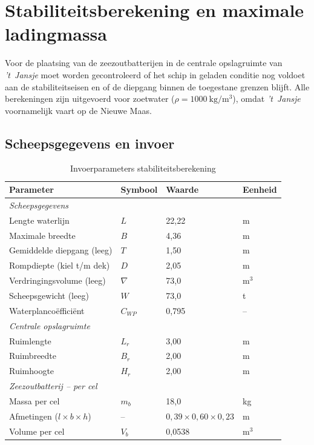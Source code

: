 \chapter{Stabiliteitsberekening en maximale ladingmassa}
\label{chap:stabiliteit}

Voor de plaatsing van de zeezoutbatterijen in de centrale opslagruimte van
\emph{'t~Jansje} moet worden gecontroleerd of het schip in geladen conditie
nog voldoet aan de stabiliteitseisen en of de diepgang binnen de toegestane
grenzen blijft. Alle berekeningen zijn uitgevoerd voor zoetwater
($\rho = 1000\ \mathrm{kg/m^3}$), omdat \emph{'t~Jansje} voornamelijk vaart
op de Nieuwe Maas.

\section{Scheepsgegevens en invoer}
\label{sec:stab_geometrie}

\begin{table}[H]
\centering
\caption{Invoerparameters stabiliteitsberekening}
\label{tab:stab_input}
\begin{tabular}{llll}
\toprule
Parameter & Symbool & Waarde & Eenheid \\
\midrule
\multicolumn{4}{l}{\textit{Scheepsgegevens}} \\
\midrule
Lengte waterlijn            & $L$      & 22{,}22 & m     \\
Maximale breedte            & $B$      &  4{,}36 & m     \\
Gemiddelde diepgang (leeg)  & $T$      &  1{,}50 & m     \\
Rompdiepte (kiel t/m dek)   & $D$      &  2{,}05 & m     \\
Verdringingsvolume (leeg)   & $\nabla$ & 73{,}0  & m$^3$ \\
Scheepsgewicht (leeg)       & $W$      & 73{,}0  & t     \\
Waterplancoëfficiënt        & $C_{WP}$ &  0{,}795& --    \\
\midrule
\multicolumn{4}{l}{\textit{Centrale opslagruimte}} \\
\midrule
Ruimlengte                  & $L_r$    &  3{,}00 & m     \\
Ruimbreedte                 & $B_r$    &  2{,}00 & m     \\
Ruimhoogte                  & $H_r$    &  2{,}00 & m     \\
\midrule
\multicolumn{4}{l}{\textit{Zeezoutbatterij -- per cel \cite{DrTenInfo2025}}} \\
\midrule
Massa per cel               & $m_b$    & 18{,}0  & kg    \\
Afmetingen ($l \times b \times h$) & -- & $0{,}39 \times 0{,}60 \times 0{,}23$ & m \\
Volume per cel              & $V_b$    & 0{,}0538& m$^3$ \\
\bottomrule
\end{tabular}
\end{table}

